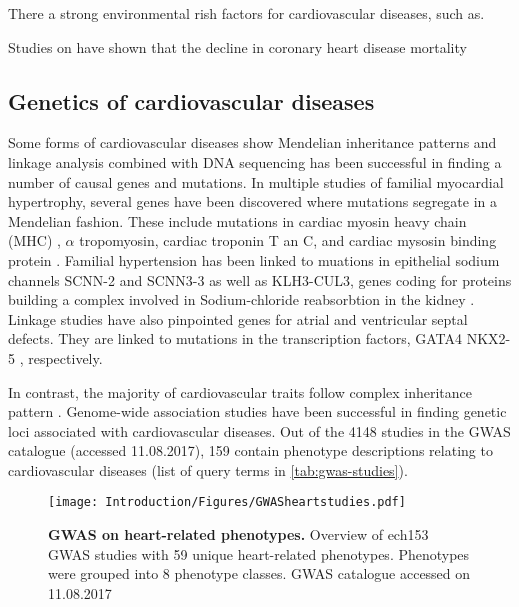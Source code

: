 There a strong environmental rish factors for cardiovascular diseases, such as.

Studies on have shown that the decline in coronary heart disease mortality \citep{Unal2004}


\subsection{Genetics of cardiovascular diseases}

Some forms of cardiovascular diseases show Mendelian inheritance patterns and linkage analysis combined with DNA sequencing has been successful in finding a number of causal genes and mutations. 
In multiple studies of familial myocardial hypertrophy, several genes have been discovered where mutations segregate in a Mendelian fashion. These include mutations in cardiac myosin heavy chain (MHC) \citep{Geisterfer-Lowrance1990}, \(\alpha\) tropomyosin, cardiac troponin T an C, \citep{Thierfelder1994, Kimuara1997} and cardiac mysosin binding protein \citep{Carrier1993,Bonne1995}. Familial hypertension has been linked to muations in epithelial sodium channels  SCNN-2 and SCNN3-3 \citep{Boyden2012,Glover2014} as well as KLH3-CUL3, genes coding for proteins building a complex involved in Sodium-chloride reabsorbtion in the kidney  \citep{Hanssen1995}. Linkage studies have also pinpointed genes for atrial and ventricular septal defects. They are linked to mutations in the transcription factors,  GATA4 \citep{Schott1998} NKX2-5 \citep{Garg2003}, respectively. 

In contrast, the majority of cardiovascular traits follow complex inheritance pattern \citep{Kathiresan2012}. Genome-wide association studies have been successful in finding genetic loci associated with cardiovascular diseases. Out of the \num{4148} studies in the GWAS catalogue (accessed 11.08.2017), \num{159} contain phenotype descriptions relating to cardiovascular diseases (list of query terms in \cref{tab:gwas-studies}).
\\
\begin{figure}[hbtp]
	\centering
	\texttt{[image: Introduction/Figures/GWASheartstudies.pdf]}
	\caption[\textbf{GWAS on heart-related phenotypes. }]{\textbf{GWAS on heart-related phenotypes. } Overview of ech\num{153} GWAS studies with \num{59} unique heart-related phenotypes. Phenotypes were grouped into \num{8} phenotype classes. GWAS catalogue accessed on 11.08.2017} 
	 	\label{fig:gwas-heart}
\end{figure}

